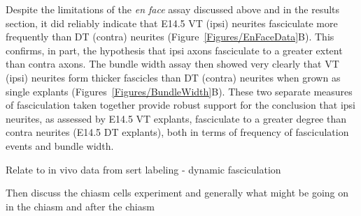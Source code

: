 Despite the limitations of the \emph{en face} assay discussed above and in the results section, it did reliably indicate that E14.5 VT (ipsi) neurites fasciculate more frequently than DT (contra) neurites (Figure~\ref{Figures/EnFaceData}B).
This confirms, in part, the hypothesis that ipsi axons fasciculate to a greater extent than contra axons.
The bundle width assay then showed very clearly that VT (ipsi) neurites form thicker fascicles than DT (contra) neurites when grown as single explants (Figures~\ref{Figures/BundleWidth}B).
These two separate measures of fasciculation taken together provide robust support for the conclusion that ipsi neurites, as assessed by E14.5 VT explants, fasciculate to a greater degree than contra neurites (E14.5 DT explants), both in terms of frequency of fasciculation events and bundle width.


%
Relate to in vivo data from sert labeling - dynamic fasciculation

Then discuss the chiasm cells experiment
and generally what might be going on in the chiasm and after the chiasm

